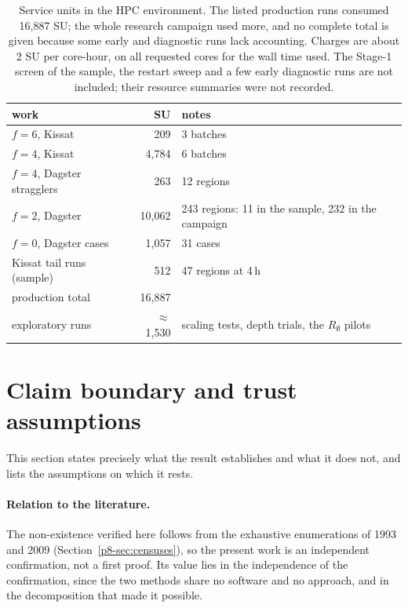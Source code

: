 \documentclass[11pt,a4paper,oneside]{report}
\theoremstyle{definition}
\begin{document}
\begin{table}[H]
\centering
\begin{tabular}{@{}lrl@{}}
\toprule
work & SU & notes \\
\midrule
$f=6$, Kissat & 209 & 3 batches \\
$f=4$, Kissat & 4{,}784 & 6 batches \\
$f=4$, Dagster stragglers & 263 & 12 regions \\
$f=2$, Dagster & 10{,}062 & 243 regions: 11 in the sample, 232 in the campaign \\
$f=0$, Dagster cases & 1{,}057 & 31 cases \\
Kissat tail runs (sample) & 512 & 47 regions at 4\,h \\
\midrule
production total & 16{,}887 & \\
\midrule
exploratory runs & $\approx$1{,}530 & scaling tests, depth trials, the $R_\emptyset$ pilots \\
\bottomrule
\end{tabular}
\caption{Service units in the HPC environment. The listed production runs consumed
16{,}887 SU; the whole research campaign used more, and no complete total is given because
some early and diagnostic runs lack accounting. Charges are about 2 SU per core-hour, on all requested cores for the wall time used. The Stage-1 screen of the sample, the restart sweep and a few early
diagnostic runs are not included; their resource summaries were not recorded.}
\label{p8-tab:costs}
\end{table}

\section{Claim boundary and trust assumptions}\label{p8-sec:claim}
This section states precisely what the result establishes and what it does not, and lists the assumptions on which it rests.


\paragraph{Relation to the literature.} The non-existence verified here follows from the
exhaustive enumerations of 1993 and 2009 (Section~\ref{p8-sec:censuses}), so
the present work is an independent confirmation, not a first proof. Its value lies in the
independence of the confirmation, since the two methods share no software and no approach, and
in the decomposition that made it possible.
\end{document}
